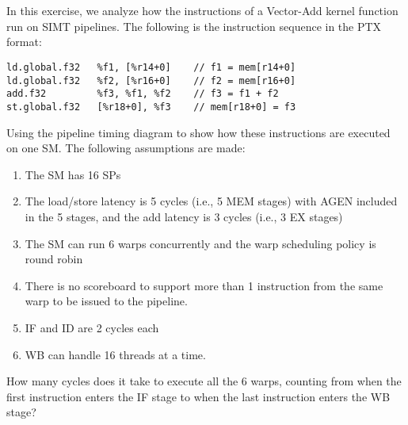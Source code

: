 \documentclass[11pt]{article}
\begin{document}
\section{}

In this exercise, we analyze how the instructions of a Vector-Add kernel function run on SIMT pipelines. The following is the instruction sequence in the PTX format:

\begin{verbatim}
ld.global.f32   %f1, [%r14+0]    // f1 = mem[r14+0]
ld.global.f32   %f2, [%r16+0]    // f2 = mem[r16+0]
add.f32         %f3, %f1, %f2    // f3 = f1 + f2
st.global.f32   [%r18+0], %f3    // mem[r18+0] = f3 
\end{verbatim}

Using the pipeline timing diagram to show how these instructions are executed on one SM. The following assumptions are made:

\begin{enumerate}
	\item The SM has 16 SPs
	\item The load/store latency is 5 cycles (i.e., 5 MEM stages) with AGEN included in the 5 stages, and the add latency is 3 cycles (i.e., 3 EX stages)
	\item The SM can run 6 warps concurrently and the warp scheduling policy is round robin
	\item There is no scoreboard to support more than 1 instruction from the same warp to be issued to the pipeline.
	\item IF and ID are 2 cycles each
	\item WB can handle 16 threads at a time.
\end{enumerate}

How many cycles does it take to execute all the 6 warps, counting from when the first instruction enters the IF stage to when the last instruction enters the WB stage?
\end{document}
